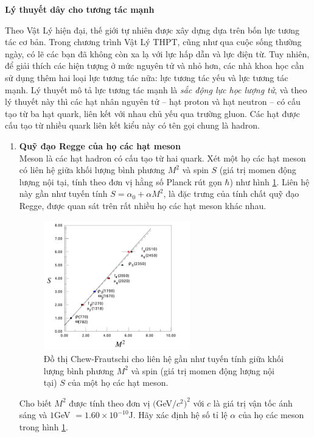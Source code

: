\textbf{Lý thuyết dây cho tương tác mạnh}

Theo Vật Lý hiện đại, thế giới tự nhiên được xây dựng dựa trên bốn lực tương tác cơ bản. Trong chương trình Vật Lý THPT, cũng như qua cuộc sống thường ngày, có lẽ các bạn đã không còn xa lạ với lực hấp dẫn và lực điện từ. Tuy nhiên, để giải thích các hiện tượng ở mức nguyên tử và nhỏ hơn, các nhà khoa học cần sử dụng thêm hai loại lực tương tác nữa: lực tương tác yếu và lực tương tác mạnh. Lý thuyết mô tả lực tương tác mạnh là {\it sắc động lực học lượng tử}, và theo lý thuyết này thì các hạt nhân nguyên tử -- hạt proton và hạt neutron -- có cấu tạo từ ba hạt quark, liên kết với nhau chủ yếu qua trường gluon. Các hạt được cấu tạo từ nhiều quark liên kết kiểu này có tên gọi chung là hadron. 

\begin{enumerate}
    \item \textbf{Quỹ đạo Regge của họ các hạt meson}\\
    Meson là các hạt hadron có cấu tạo từ hai quark. Xét một họ các hạt meson có liên hệ giữa khối lượng bình phương $M^2$ và spin $S$ (giá trị momen động lượng nội tại, tính theo đơn vị hằng số Planck rút gọn $\hbar$) như hình \ref{fig01}. Liên hệ này gần như tuyến tính $S = \alpha_0 + \alpha M^2$, là đặc trưng của tính chất quỹ đạo Regge, được quan sát trên rất nhiều họ các hạt meson khác nhau.

\begin{figure}[!htbp]
\centering
\includegraphics[width=0.6\textwidth]{Problem_20/fig01.png}%
\caption{Đồ thị Chew-Frautschi cho liên hệ gần như tuyến tính giữa khối lượng bình phương $M^2$ và spin (giá trị momen động lượng nội tại) $S$ của một họ các hạt meson.} %
\label{fig01}
\end{figure}
    
    Cho biết $M^2$ được tính theo đơn vị $($GeV$/c^2)^2$ với $c$ là giá trị vận tốc ánh sáng và $1$GeV $=1.60\times 10^{-10}$J. Hãy xác định hệ số tỉ lệ $\alpha$ của họ các meson trong hình \ref{fig01}. 
    

\end{enumerate}

